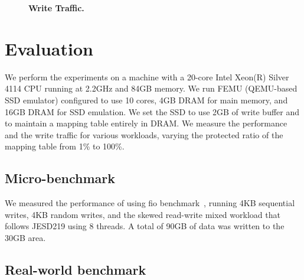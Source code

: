 \begin{figure}[t]
    \centering{}
    \caption{\textbf{Write Traffic.}}
\end{figure} 




\section{Evaluation}
We perform the experiments on a machine with a 20-core Intel Xeon(R) Silver
4114 CPU running at 2.2GHz and 84GB memory. We run FEMU (QEMU-based SSD
emulator) configured to use 10 cores, 4GB DRAM for main memory, and 16GB DRAM
for SSD emulation.  We set the SSD to use 2GB of write buffer and to maintain a
mapping table entirely in DRAM.  We measure the performance and the write
traffic for various workloads, varying the protected ratio of the mapping table
from 1\% to 100\%. 

\subsection{Micro-benchmark}
We measured the performance of \ours{} using fio benchmark~\cite{fio-bench},
running 4KB sequential writes, 4KB random writes, and the skewed read-write
mixed workload that follows JESD219 using 8 threads.  A total of 90GB of data
was written to the 30GB area.


\subsection{Real-world benchmark}

